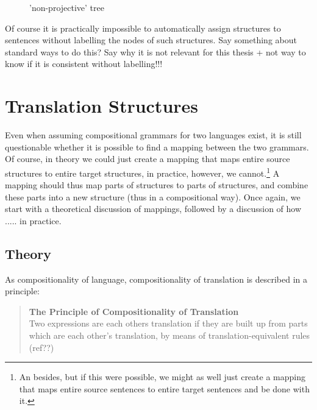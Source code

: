 \documentclass{report}
\theoremstyle{definition}
\theoremstyle{plain}
\begin{document}
\begin{figure}[!ht]
\centering
{}
\caption{'non-projective' tree}\label{fig:struct3}
\end{figure}

Of course it is practically impossible to automatically assign structures to sentences without labelling the nodes of such structures. Say something about standard ways to do this? Say why it is not relevant for this thesis
+ not way to know if it is consistent without labelling!!!


\section{Translation Structures}

Even when assuming compositional grammars for two languages exist, it is still questionable whether it is possible to find a mapping between the two grammars. Of course, in theory we could just create a mapping that maps entire source structures to entire target structures, in practice, however, we cannot.\footnote{An besides, but if this were possible, we might as well just create a mapping that maps entire source sentences to entire target sentences and be done with it.} A mapping should thus map parts of structures to parts of structures, and combine these parts into a new structure (thus in a compositional way). Once again, we start with a theoretical discussion of mappings, followed by a discussion of how ..... in practice.
 
\subsection{Theory}

As compositionality of language, compositionality of translation is described in a principle:

\begin{quote}
\textbf{The Principle of Compositionality of Translation}\\
Two expressions are each others translation if they are built up from parts which are each other's translation, by means of translation-equivalent rules (ref??)
\end{quote}
\end{document}
